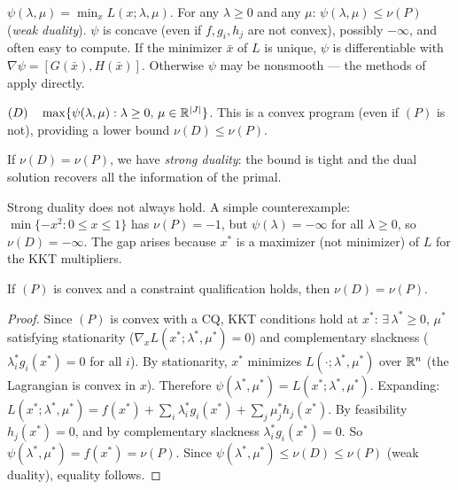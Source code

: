 \begin{defn}\label{def:lag-relax}
	$\psi(\lambda, \mu) = \min_{x} L(x; \lambda, \mu)$.
	For any $\lambda \geq 0$ and any $\mu$: $\psi(\lambda, \mu) \leq \nu(P)$ (\textit{weak duality}).
	$\psi$ is concave (even if $f, g_i, h_j$ are not convex), possibly $-\infty$, and often easy to compute.
	If the minimizer $\bar{x}$ of $L$ is unique, $\psi$ is differentiable with $\nabla\psi = [G(\bar{x}), H(\bar{x})]$.
	Otherwise $\psi$ may be nonsmooth --- the methods of  apply directly.
\end{defn}

\begin{defn}\label{def:lag-dual}
	$(D) \quad \max\{\psi(\lambda, \mu) : \lambda \geq 0,\, \mu \in \mathbb{R}^{|J|}\}$.
	This is a convex program (even if $(P)$ is not), providing a lower bound $\nu(D) \leq \nu(P)$.
\end{defn}

\begin{defn}\label{def:strong-dual}
	If $\nu(D) = \nu(P)$, we have \textit{strong duality}: the bound is tight and the dual solution recovers all the information of the primal.
\end{defn}

Strong duality does not always hold.
A simple counterexample: $\min\{-x^2 : 0 \leq x \leq 1\}$ has $\nu(P) = -1$, but $\psi(\lambda) = -\infty$ for all $\lambda \geq 0$, so $\nu(D) = -\infty$.
The gap arises because $x^*$ is a maximizer (not minimizer) of $L$ for the KKT multipliers.

\begin{thm}\label{thm:strong-dual-convex}
	If $(P)$ is convex and a constraint qualification holds, then $\nu(D) = \nu(P)$.
\end{thm}
\begin{proof}
	Since $(P)$ is convex with a CQ, KKT conditions hold at $x^*$: $\exists\, \lambda^* \geq 0$, $\mu^*$ satisfying stationarity ($\nabla_x L(x^*; \lambda^*, \mu^*) = 0$) and complementary slackness ($\lambda_i^* g_i(x^*) = 0$ for all $i$).
	By stationarity, $x^*$ minimizes $L(\cdot; \lambda^*, \mu^*)$ over $\mathbb{R}^n$ (the Lagrangian is convex in $x$).
	Therefore $\psi(\lambda^*, \mu^*) = L(x^*; \lambda^*, \mu^*)$.
	Expanding: $L(x^*; \lambda^*, \mu^*) = f(x^*) + \sum_i \lambda_i^* g_i(x^*) + \sum_j \mu_j^* h_j(x^*)$.
	By feasibility $h_j(x^*) = 0$, and by complementary slackness $\lambda_i^* g_i(x^*) = 0$.
	So $\psi(\lambda^*, \mu^*) = f(x^*) = \nu(P)$.
	Since $\psi(\lambda^*, \mu^*) \leq \nu(D) \leq \nu(P)$ (weak duality), equality follows.
\end{proof}

